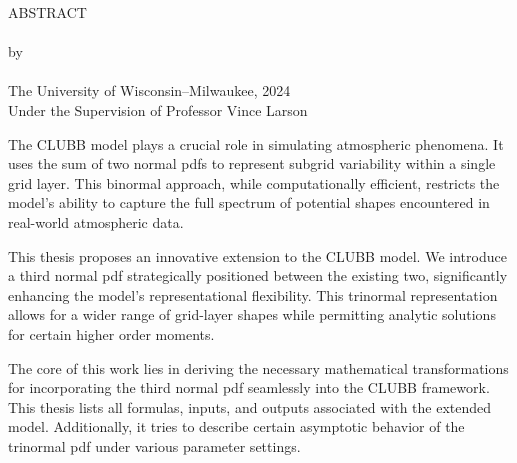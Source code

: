 \begin{center}
    ABSTRACT
    \\
    \singlespacing
    \mytitle\\
    \doublespacing
    by\\
    \myauthor\\
    \singlespacing
    The University of Wisconsin--Milwaukee, 2024\\
    Under the Supervision of Professor Vince Larson
\end{center}

The \gls{CLUBB} model plays a crucial role in simulating atmospheric phenomena.
It uses the sum of two normal \glspl{pdf} to represent subgrid variability within a single grid layer.
This binormal approach, while computationally efficient,
restricts the model's ability to capture the full spectrum of potential shapes encountered in real-world atmospheric data.

This thesis proposes an innovative extension to the \gls{CLUBB} model.
We introduce a third normal \gls{pdf} strategically positioned between the existing two,
significantly enhancing the model's representational flexibility.
This trinormal representation allows for a wider range of grid-layer shapes
while permitting analytic solutions for certain higher order moments.

The core of this work lies in deriving the necessary mathematical transformations
for incorporating the third normal \gls{pdf} seamlessly into the \gls{CLUBB} framework.
This thesis lists all formulas, inputs, and outputs associated with the extended model.
Additionally,
it tries to describe certain asymptotic behavior of the trinormal \gls{pdf}
under various parameter settings.
